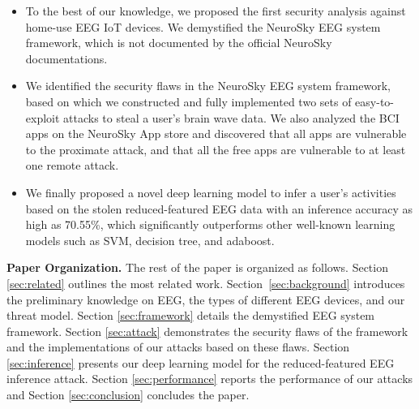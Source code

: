 \begin{itemize}
\item To the best of our knowledge, we proposed the first security analysis against home-use EEG IoT devices. We demystified the NeuroSky EEG system framework, which is not documented by the official NeuroSky documentations.

\item We identified the security flaws in the NeuroSky EEG system framework, based on which we constructed and fully implemented two sets of easy-to-exploit attacks to steal a user's brain wave data. %
We also analyzed the BCI apps on the NeuroSky App store and discovered that all apps are vulnerable to the proximate attack, and that all the free apps are vulnerable to at least one remote attack. %

\item We finally proposed a novel deep learning model to infer a user's activities based on the stolen reduced-featured EEG data with an inference accuracy as high as 70.55\%, which significantly outperforms other well-known learning models such as SVM, decision tree, and adaboost.
\end{itemize}

\indent \textbf{Paper Organization.} The rest of the paper is organized as follows. Section \ref{sec:related} outlines the most related work. Section~\ref{sec:background} introduces the preliminary knowledge on EEG, the types of different EEG devices, and our threat model. Section \ref{sec:framework} details the demystified EEG system framework. Section \ref{sec:attack} demonstrates the security flaws of the framework and the implementations of our attacks based on these flaws. Section \ref{sec:inference} presents our deep learning model for the reduced-featured EEG inference attack. Section \ref{sec:performance} reports the performance of our attacks and Section   \ref{sec:conclusion} concludes the paper.


